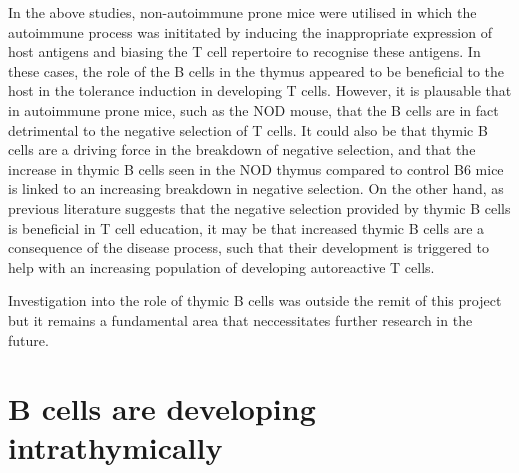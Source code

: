 In the above studies, non-autoimmune prone mice were utilised in which the autoimmune process was inititated by inducing the inappropriate expression of host antigens and biasing the T cell repertoire to recognise these antigens.
In these cases, the role of the B cells in the thymus appeared to be beneficial to the host in the tolerance induction in developing T cells.
However, it is plausable that in autoimmune prone mice, such as the NOD mouse, that the B cells are in fact detrimental to the negative selection of T cells.
It could also be that thymic B cells are a driving force in the breakdown of negative selection, and that the increase in thymic B cells seen in the NOD thymus compared to control B6 mice is linked to an increasing breakdown in negative selection.
On the other hand, as previous literature suggests that the negative selection provided by thymic B cells is beneficial in T cell education, it may be that increased thymic B cells are a consequence of the disease process, such that their development is triggered to help with an increasing population of developing autoreactive T cells.

Investigation into the role of thymic B cells was outside the remit of this project but it remains a fundamental area that neccessitates further research in the future.



\section{B cells are developing intrathymically}

